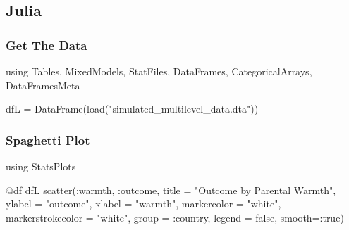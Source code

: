 \documentclass[
  letterpaper,
  DIV=11,
  numbers=noendperiod]{scrreprt}
\newenvironment{Shaded}{\begin{snugshade}}{\end{snugshade}}
\newcommand{\BuiltInTok}[1]{\textcolor[rgb]{0.00,0.23,0.31}{#1}}
\newcommand{\ConstantTok}[1]{\textcolor[rgb]{0.56,0.35,0.01}{#1}}
\newcommand{\FunctionTok}[1]{\textcolor[rgb]{0.28,0.35,0.67}{#1}}
\newcommand{\ImportTok}[1]{\textcolor[rgb]{0.00,0.46,0.62}{#1}}
\newcommand{\NormalTok}[1]{\textcolor[rgb]{0.00,0.23,0.31}{#1}}
\newcommand{\OperatorTok}[1]{\textcolor[rgb]{0.37,0.37,0.37}{#1}}
\newcommand{\PreprocessorTok}[1]{\textcolor[rgb]{0.68,0.00,0.00}{#1}}
\newcommand{\StringTok}[1]{\textcolor[rgb]{0.13,0.47,0.30}{#1}}
\begin{document}
\subsection{Julia}

\subsubsection{Get The Data}\label{get-the-data-8}

\begin{Shaded}
\begin{Highlighting}[]
\ImportTok{using} \BuiltInTok{Tables}\NormalTok{, }\BuiltInTok{MixedModels}\NormalTok{, }\BuiltInTok{StatFiles}\NormalTok{, }\BuiltInTok{DataFrames}\NormalTok{, }\BuiltInTok{CategoricalArrays}\NormalTok{, }\BuiltInTok{DataFramesMeta}

\NormalTok{dfL }\OperatorTok{=} \FunctionTok{DataFrame}\NormalTok{(}\FunctionTok{load}\NormalTok{(}\StringTok{"simulated\_multilevel\_data.dta"}\NormalTok{))}
\end{Highlighting}
\end{Shaded}

\subsubsection{Spaghetti Plot}\label{spaghetti-plot-2}

\begin{Shaded}
\begin{Highlighting}[]
\ImportTok{using} \BuiltInTok{StatsPlots}

\PreprocessorTok{@df}\NormalTok{ dfL }\FunctionTok{scatter}\NormalTok{(}\OperatorTok{:}\NormalTok{warmth, }\OperatorTok{:}\NormalTok{outcome, }
\NormalTok{               title }\OperatorTok{=} \StringTok{"Outcome by Parental Warmth"}\NormalTok{,}
\NormalTok{               ylabel }\OperatorTok{=} \StringTok{"outcome"}\NormalTok{,}
\NormalTok{               xlabel }\OperatorTok{=} \StringTok{"warmth"}\NormalTok{,}
\NormalTok{               markercolor }\OperatorTok{=} \StringTok{"white"}\NormalTok{,}
\NormalTok{               markerstrokecolor }\OperatorTok{=} \StringTok{"white"}\NormalTok{,}
\NormalTok{               group }\OperatorTok{=} \OperatorTok{:}\NormalTok{country,}
\NormalTok{               legend }\OperatorTok{=} \ConstantTok{false}\NormalTok{,}
\NormalTok{               smooth}\OperatorTok{=:}\ConstantTok{true}\NormalTok{)}
\end{Highlighting}
\end{Shaded}
\end{document}

